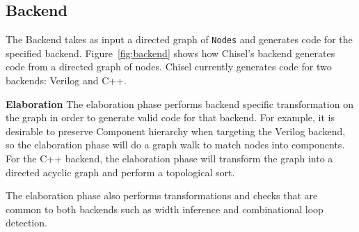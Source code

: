 \subsection{Backend}
The Backend takes as input a directed graph of {\tt Nodes} and
generates code for the specified backend. Figure~\ref{fig:backend}
shows how Chisel's backend generates code from a directed graph of
nodes. Chisel currently generates code for two backends: Verilog and C++.

{\bf Elaboration} The elaboration phase performs backend specific
transformation on the graph in order to generate valid code for that
backend. For example, it is desirable to preserve Component hierarchy
when targeting the Verilog backend, so the elaboration phase will do a
graph walk to match nodes into components. For the C++ backend, the
elaboration phase will transform the graph into a directed acyclic
graph and perform a topological sort.

The elaboration phase also performs transformations and checks that
are common to both backends such as width inference and combinational
loop detection.

